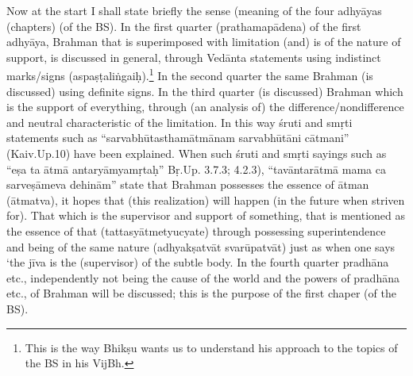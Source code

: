 


Now at the start I shall state briefly the sense (meaning of the four adhyāyas (chapters) (of the BS). In the first quarter (prathamapādena) of the first adhyāya, Brahman that is superimposed with limitation (and) is of the nature of support, is discussed in general, through Vedānta statements using indistinct marks/signs (aspaṣṭaliṅgaiḥ).\footnote{This is the way Bhikṣu wants us to understand his approach to the topics of the BS in his VijBh.} In the second  quarter the same Brahman (is discussed) using definite signs. In the third quarter (is discussed) Brahman which is the support of everything, through (an analysis of) the difference/non\-difference and neutral characteristic of the limitation.  In this way śruti and smṛti statements such as “sarvabhūtasthamātmānam sarvabhūtāni cātmani” (Kaiv.Up.10) have been explained. When such śruti and smṛti sayings such as “eṣa ta ātmā antaryāmyamṛtaḥ” Bṛ.Up. 3.7.3; 4.2.3), “tavāntarātmā mama ca sarveṣāmeva dehinām” state that Brahman possesses the essence of ātman (ātmatva), it hopes that (this realization) will happen (in the future when striven for). That which is the supervisor and support of something, that is mentioned as the essence of that (tattasyātmetyucyate) through possessing superintendence and being of the same nature (adhyakṣatvāt svarūpatvāt) just as when one says ‘the jīva is the (supervisor) of the subtle body. In the fourth quarter pradhāna etc., independently not being the cause of the world and the powers of pradhāna etc., of Brahman will be discussed; this is the purpose of the first chaper (of the BS). 

